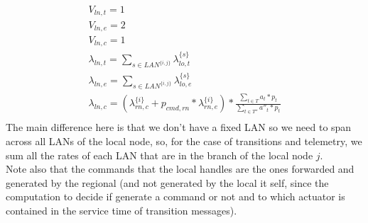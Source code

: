 \documentclass[11pt]{article}
\begin{document}
\begin{equation}
    \begin{array}{l}
        V_{ln, t} = 1 \\
        V_{ln, e} = 2 \\ %
        V_{ln, c} = 1 \\
        \lambda_{ln, t} = \sum\limits_{s \in LAN^{\{i,j\}}}{\lambda^{\{s\}}_{lo, t}}  \\
        \lambda_{ln, e} = \sum\limits_{s \in LAN^{\{i,j\}}}{\lambda^{\{s\}}_{lo, e}} \\
		\lambda_{ln, c}= (\lambda^{\{i\}}_{rn, c} + p_{cmd,rn} * \lambda^{\{i\}}_{rn, e}) *\frac{\sum\limits_{t \in T}{a_{t} * p_{t}}}{\sum\limits_{t \in T''}{a''_{t} * p_{t}}} \\\


    \end{array}
\end{equation}
The main difference here is that we don't have a fixed LAN so we need to span across all LANs of the local node, so, for the case of transitions and telemetry, we sum all the rates of each LAN that are in the branch of the local node $j$. \\
Note also that the commands that the local handles are the ones forwarded and generated by the regional (and not generated by the local it self, since the computation to decide if generate a command or not and to which actuator is contained in the service time of transition messages). \\
\end{document}
